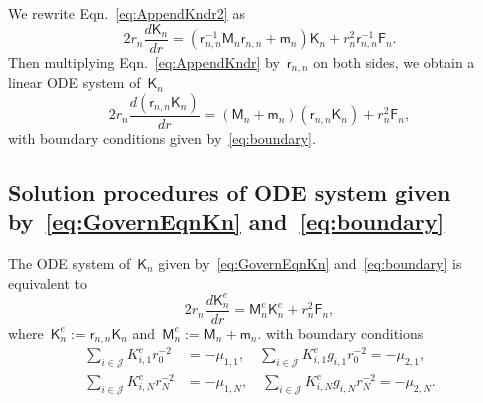 \documentclass[preprint,10pt,times]{elsarticle}
\numberwithin{equation}{section}
\renewcommand{\u}[1]{\boldsymbol{#1}}
\newcommand{\usf}[1]{\u{\mathsf #1}}
\newcommand{\pr}[1]{\left( #1 \right)}
\renewcommand{\>}{$\Rightarrow$}
\begin{document}
We rewrite Eqn.~\eqref{eq:AppendKndr2} as
\begin{equation}
	2 r_{n} \frac{d \usf{K}_n}{dr} = \left( \usf{r}_{n,n}^{-1} \usf{M}_n \usf{r}_{n,n} + \usf{m}_n \right) \usf{K}_n + r_n^2 \usf{r}_{n,n}^{-1} \usf{F}_n.
	\label{eq:AppendKndr}
\end{equation}
Then multiplying Eqn.~\eqref{eq:AppendKndr} by~$\usf{r}_{n,n}$ on both sides, we obtain a linear ODE system of~$\usf{K}_n$
\begin{equation}
	2 r_n \frac{d \pr{\usf{r}_{n,n}\usf{K}_n}}{dr} = \pr{\usf{M}_n + \usf{m}_n} \pr{\usf{r}_{n,n}\usf{K}_n} + r^2_n \usf{F}_n,
	\label{eq:AppendKn}
\end{equation}
with boundary conditions given by~\eqref{eq:boundary}.


\subsection{Solution procedures of ODE system given by~\eqref{eq:GovernEqnKn} and~\eqref{eq:boundary}}
\label{Appen:SolvingODE}

The ODE system of~$\usf{K}_n$ given by~\eqref{eq:GovernEqnKn} and~\eqref{eq:boundary} is equivalent to
\begin{equation}
	2 r_n \frac{d\usf{K}_n^e}{dr} = \usf{M}_n^e \usf{K}_n^e + r^2_n \usf{F}_n,
	\label{eq:AppendKendr}
\end{equation}
where~$\usf{K}_n^e := \usf{r}_{n,n}\usf{K}_n$ and~$\usf{M}_n^e := \usf{M}_n + \usf{m}_n$. with boundary conditions
\begin{subequations}
	\begin{align}
	\sum_{i \in \mathcal{J}} K^e_{i,1} r_0^{-2} & = -\mu_{1,1}, \quad
	 \sum_{i \in \mathcal{J}} K^e_{i,1} g_{i,1} r_0^{-2} = -\mu_{2,1},\\
	\sum_{i \in \mathcal{J}} K^e_{i,N} r_N^{-2} & = -\mu_{1,N}, \quad
	 \sum_{i \in \mathcal{J}} K^e_{i,N} g_{i,N} r_N^{-2} = -\mu_{2,N}.
	\end{align}
	\label{eq:Appenboundary}
\end{subequations}
\end{document}
